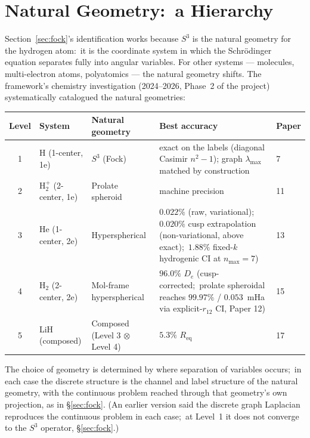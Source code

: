 \documentclass[11pt,a4paper]{article}
\newcommand{\sthree}{S^{3}}
\begin{document}
\section{Natural Geometry:\ a Hierarchy}
\label{sec:natural_geometry}

Section~\ref{sec:fock}'s identification works because $\sthree$ is the
natural geometry for the hydrogen atom:\ it is the coordinate system in
which the Schr\"odinger equation separates fully into angular
variables.  For other systems --- molecules, multi-electron atoms,
polyatomics --- the natural geometry shifts.  The framework's chemistry
investigation (2024--2026, Phase~2 of the project) systematically
catalogued the natural geometries:

\begin{center}
\begin{tabular}{@{}cllll@{}}
\toprule
Level & System & Natural geometry & Best accuracy & Paper \\
\midrule
1 & H (1-center, 1e) & $\sthree$ (Fock) & exact on the labels (diagonal Casimir $n^2-1$); graph $\lambda_{\max}$ matched by construction & 7 \\
2 & H$_2^+$ (2-center, 1e) & Prolate spheroid & machine precision & 11 \\
3 & He (1-center, 2e) & Hyperspherical & $0.022\%$ (raw, variational);\ $0.020\%$ cusp extrapolation (non-variational, above exact);\ $1.88\%$ fixed-$k$ hydrogenic CI at $n_{\max}=7$) & 13 \\
4 & H$_2$ (2-center, 2e) & Mol-frame hyperspherical & $96.0\%$ $D_e$ (cusp-corrected;\ prolate spheroidal reaches $99.97\%$ / $0.053$~mHa via explicit-$r_{12}$ CI, Paper 12) & 15 \\
5 & LiH (composed) & Composed (Level 3 $\otimes$ Level 4) & $5.3\%$ $R_{\mathrm{eq}}$ & 17 \\
\bottomrule
\end{tabular}
\end{center}

The choice of geometry is determined by where separation of variables
occurs;\ in each case the discrete structure is the channel and label
structure of the natural geometry, with the continuous problem reached
through that geometry's own projection, as in \S\ref{sec:fock}.  (An
earlier version said the discrete graph Laplacian reproduces the
continuous problem in each case;\ at Level~1 it does not converge to
the $\sthree$ operator, \S\ref{sec:fock}.)
\end{document}
